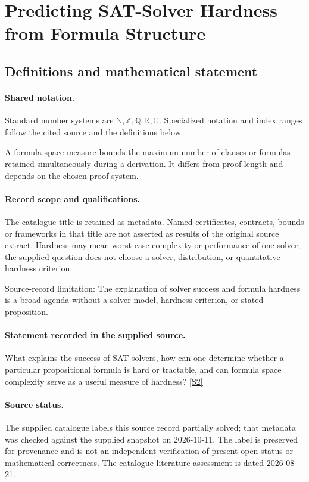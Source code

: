 \documentclass[11pt]{article}
\newcommand{\sref}[2]{\hyperlink{source:#1:#2}{[S#2]}}
\begin{document}
\section{Predicting SAT-Solver Hardness from Formula Structure}\label{statement}

\subsection{Definitions and mathematical statement}

\paragraph{Shared notation.}Standard number systems are $\mathbb N,\mathbb Z,\mathbb Q,\mathbb R,\mathbb C$. Specialized notation and index ranges follow the cited source and the definitions below.


A formula-space measure bounds the maximum number of clauses or formulas retained simultaneously during a derivation. It differs from proof length and depends on the chosen proof system.
\paragraph{Record scope and qualifications.}
The catalogue title is retained as metadata. Named certificates, contracts, bounds or frameworks in that title are not asserted as results of the original source extract.
Hardness may mean worst-case complexity or performance of one solver; the supplied question does not choose a solver, distribution, or quantitative hardness criterion.

Source-record limitation: The explanation of solver success and formula hardness is a broad agenda without a solver model, hardness criterion, or stated proposition.
\paragraph{Statement recorded in the supplied source.}
What explains the success of SAT solvers, how can one determine whether a particular propositional formula is hard or tractable, and can formula space complexity serve as a useful measure of hardness? \sref{statement}{2}
\paragraph{Source status.}
The supplied catalogue labels this source record partially solved; that metadata was checked against the supplied snapshot on 2026-10-11. The label is preserved for provenance and is not an independent verification of present open status or mathematical correctness. The catalogue literature assessment is dated 2026-08-21.
\end{document}
